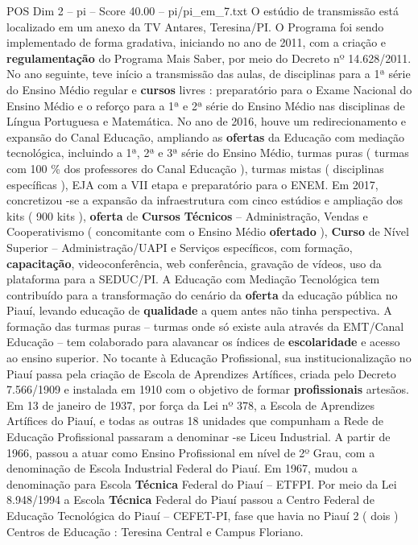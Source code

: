 \begin{textsample}{POS Dim 2 – pi – Score 40.00 – pi/pi\_em\_7.txt}
O estúdio de transmissão está localizado em um anexo da TV Antares, Teresina/PI.
O Programa foi sendo implementado de forma gradativa, iniciando no ano de 2011, com a criação e \textbf{regulamentação} do Programa Mais Saber, por meio do Decreto nº 14.628/2011.
No ano seguinte, teve início a transmissão das aulas, de disciplinas para a 1ª série do Ensino Médio regular e \textbf{cursos} livres : preparatório para o Exame Nacional do Ensino Médio e o reforço para a 1ª e 2ª série do Ensino Médio nas disciplinas de Língua Portuguesa e Matemática.
No ano de 2016, houve um redirecionamento e expansão do Canal Educação, ampliando as \textbf{ofertas} da Educação com mediação tecnológica, incluindo a 1ª, 2ª e 3ª série do Ensino Médio, turmas puras ( turmas com 100 \% dos professores do Canal Educação ), turmas mistas ( disciplinas específicas ), EJA com a VII etapa e preparatório para o ENEM.
Em 2017, concretizou -se a expansão da infraestrutura com cinco estúdios e ampliação dos kits ( 900 kits ), \textbf{oferta} de \textbf{Cursos} \textbf{Técnicos} – Administração, Vendas e Cooperativismo ( concomitante com o Ensino Médio \textbf{ofertado} ), \textbf{Curso} de Nível Superior – Administração/UAPI e Serviços específicos, com formação, \textbf{capacitação}, videoconferência, web conferência, gravação de vídeos, uso da plataforma para a SEDUC/PI.
A Educação com Mediação Tecnológica tem contribuído para a transformação do cenário da \textbf{oferta} da educação pública no Piauí, levando educação de \textbf{qualidade} a quem antes não tinha perspectiva.
A formação das turmas puras – turmas onde só existe aula através da EMT/Canal Educação – tem colaborado para alavancar os índices de \textbf{escolaridade} e acesso ao ensino superior.
No tocante à Educação Profissional, sua institucionalização no Piauí passa pela criação de Escola de Aprendizes Artífices, criada pelo Decreto 7.566/1909 e instalada em 1910 com o objetivo de formar \textbf{profissionais} artesãos.
Em 13 de janeiro de 1937, por força da Lei nº 378, a Escola de Aprendizes Artífices do Piauí, e todas as outras 18 unidades que compunham a Rede de Educação Profissional passaram a denominar -se Liceu Industrial.
A partir de 1966, passou a atuar como Ensino Profissional em nível de 2º Grau, com a denominação de Escola Industrial Federal do Piauí.
Em 1967, mudou a denominação para Escola \textbf{Técnica} Federal do Piauí – ETFPI.
Por meio da Lei 8.948/1994 a Escola \textbf{Técnica} Federal do Piauí passou a Centro Federal de Educação Tecnológica do Piauí – CEFET-PI, fase que havia no Piauí 2 ( dois ) Centros de Educação : Teresina Central e Campus Floriano.

\end{textsample}
